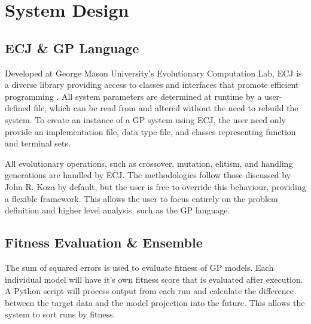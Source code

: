 \documentclass[12pt, letterpaper]{article}
\begin{document}
\newpage 

\section{System Design}

\subsection{ECJ \& GP Language}

\textrm{\indent Developed at George Mason University's Evolutionary Computation Lab, ECJ is a diverse library providing access to classes and interfaces that promote efficient programming \cite{ecj}. All system parameters are determined at runtime by a user-defined file, which can be read from and altered without the need to rebuild the system. To create an instance of a GP system using ECJ, the user need only provide an implementation file, data type file, and classes representing function and terminal sets. }

\textrm{ All evolutionary operations, such as crossover, mutation, elitism, and handling generations are handled by ECJ. The methodologies follow those discussed by John R. Koza \cite{koza1992} by default, but the user is free to override this behaviour, providing a flexible framework. This allows the user to focus entirely on the problem definition and higher level analysis, such as the GP language. }


\subsection{Fitness Evaluation \& Ensemble}

\textrm{ \indent The sum of squared errors is used to evaluate fitness of GP models. Each individual model will have it's own fitness score that is evaluated after execution. A Python script will process output from each run and calculate the difference between the target data and the model projection into the future. This allows the system to sort runs by fitness. }
\end{document}
